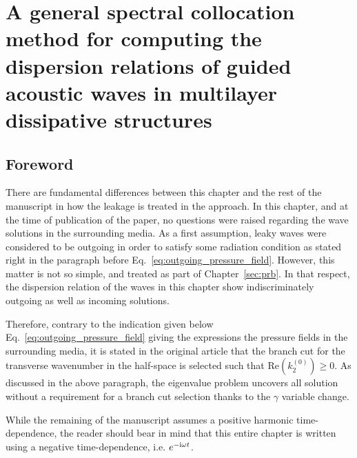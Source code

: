 \chapter{A general spectral collocation method for computing the dispersion relations of guided acoustic waves in multilayer dissipative structures}
\label{chap:jap}

    {}
    
\section*{Foreword}{ {}}
\label{sec:foreword}
There are fundamental differences between this chapter and the rest of the manuscript in how the leakage is treated in the approach. In this chapter, and at the time of publication of the paper, no questions were raised regarding the wave solutions in the surrounding media. As a first assumption, leaky waves were considered to be outgoing in order to satisfy some radiation condition as stated right in the paragraph before Eq.~\ref{eq:outgoing_pressure_field}. However, this matter is not so simple, and treated as part of Chapter~\ref{sec:prb}. In that respect, the dispersion relation of the waves in this chapter show indiscriminately outgoing as well as incoming solutions.

Therefore, contrary to the indication given below Eq.~\ref{eq:outgoing_pressure_field} giving the expressions the pressure fields in the surrounding media, it is stated in the original article that the branch cut for the transverse wavenumber in the half-space is selected such that $\textrm{Re}\left( k_{2}^{(0)}\right)\geq 0$. As discussed in the above paragraph, the eigenvalue problem uncovers all solution without a requirement for a branch cut selection thanks to the $\gamma$ variable change. 

While the remaining of the manuscript assumes a positive harmonic time-dependence, the reader should bear in mind that this entire chapter is written using a negative time-dependence, i.e. $e^{-\mathrm i \omega t}$.


